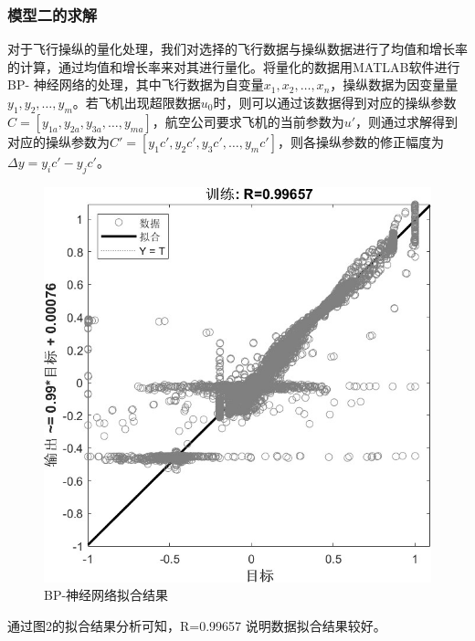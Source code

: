 \documentclass[UTF8]{ctexart}
\begin{document}
\subsubsection{模型二的求解}
对于飞行操纵的量化处理，我们对选择的飞行数据与操纵数据进行了均值和增长率的计算，通过均值和增长率来对其进行量化。将量化的数据用MATLAB软件进行BP- 神经网络的处理，其中飞行数据为自变量$x_1,x_2,…,x_n$，操纵数据为因变量量$y_1,y_2,…,y_m$。若飞机出现超限数据$u_0$时，则可以通过该数据得到对应的操纵参数$C=\left[ y_{1a},y_{2a},y_{3a},…,y_{ma} \right] $，航空公司要求飞机的当前参数为$u\prime$，则通过求解得到对应的操纵参数为$C\prime=\left[ y_1c\prime,y_2c\prime,y_3c\prime,…,y_mc\prime \right] $，则各操纵参数的修正幅度为$\varDelta y=y_ic\prime-y_jc\prime$。\par 
	\begin{figure}[h]
	\centering
	\includegraphics[scale=0.8]{BP-神经网络拟合结果.jpeg}
	\caption{BP-神经网络拟合结果}
\end{figure}\par
通过图2的拟合结果分析可知，R=0.99657 说明数据拟合结果较好。 \par
\end{document}
